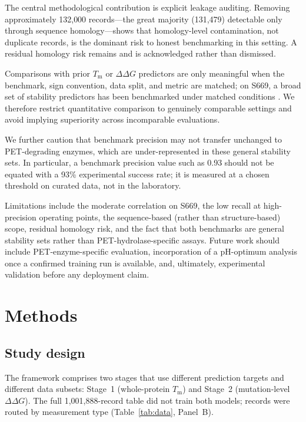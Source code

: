 \documentclass[sn-nature]{sn-jnl}%
\newcommand{\ddg}{\ensuremath{\Delta\Delta G}}
\newcommand{\Tm}{\ensuremath{T_\mathrm{m}}}
\begin{document}
The central methodological contribution is explicit leakage auditing. Removing
approximately 132{,}000 records---the great majority (131{,}479) detectable only through
sequence homology---shows that homology-level contamination, not duplicate records, is the
dominant risk to honest benchmarking in this setting. A residual homology risk remains and
is acknowledged rather than dismissed.

Comparisons with prior \Tm{} or \ddg{} predictors are only meaningful when the benchmark,
sign convention, data split, and metric are matched; on S669, a broad set of stability
predictors has been benchmarked under matched conditions \cite{pancotti2022s669}. We therefore
restrict quantitative
comparison to genuinely comparable settings and avoid implying superiority across
incomparable evaluations.

We further caution that benchmark precision may not transfer unchanged to PET-degrading
enzymes, which are under-represented in these general stability sets. In particular, a
benchmark precision value such as 0.93 should not be equated with a 93\% experimental
success rate; it is measured at a chosen threshold on curated data, not in the laboratory.

Limitations include the moderate correlation on S669, the low recall at high-precision
operating points, the sequence-based (rather than structure-based) scope, residual
homology risk, and the fact that both benchmarks are general stability sets rather than
PET-hydrolase-specific assays. Future work should include PET-enzyme-specific evaluation,
incorporation of a pH-optimum analysis once a confirmed training run is available, and,
ultimately, experimental validation before any deployment claim.

\section{Methods}\label{sec:methods}

\subsection{Study design}
The framework comprises two stages that use different prediction targets and different data
subsets: Stage~1 (whole-protein \Tm) and Stage~2 (mutation-level \ddg). The full
1{,}001{,}888-record table did not train both models; records were routed by measurement
type (Table~\ref{tab:data}, Panel~B).
\end{document}
